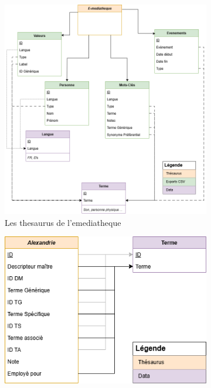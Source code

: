 \begin{figure}[htbp]
	\centering
	\begin{subfigure}{0.45\textwidth}
		\centering
		\includegraphics[width=\linewidth]{img/UML_emediatheque}
		\caption{Les \gls{thesaurus} de l'\gls{emediatheque}}
		\label{uml:emediatheque}
	\end{subfigure}
	\begin{subfigure}{0.45\textwidth}
		\centering
		\includegraphics[width=\linewidth]{img/UML_alexandrie}

\end{subfigure}
\end{figure}
